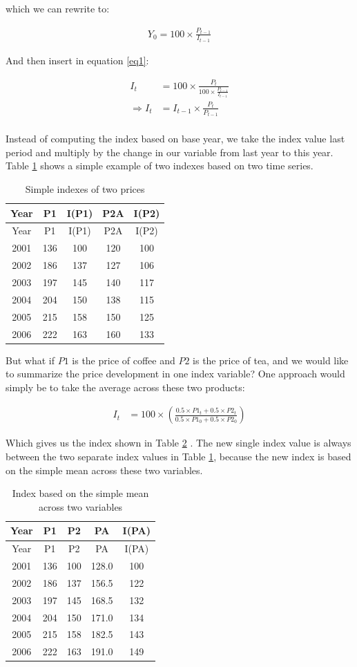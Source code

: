 \documentclass[]{book}
\begin{document}
which we can rewrite to:

\begin{align}
    Y_0=100\times \frac{P_{t-1}}{I_{t-1}}
    \label{eq3}
\end{align}

And then insert in equation \eqref{eq1}:

\begin{align}
    I_t&=100\times \frac{P_t}{100\times \frac{P_{t-1}}{I_{t-1}}}\nonumber\\
        \Rightarrow I_t&=I_{t-1}\times \frac{P_t}{ P_{t-1}}\nonumber\\
    \label{eq4}
\end{align}

Instead of computing the index based on base year, we take the index value last period and multiply by the change in our variable from last year to this year. Table \ref{tab:price1} shows a simple example of two indexes based on two time series.

\begin{longtable}[]{@{}ccccc@{}}
\caption{\label{tab:price1} Simple indexes of two prices}\tabularnewline
\toprule
Year & P1 & I(P1) & P2A & I(P2)\tabularnewline
\midrule
\endfirsthead
\toprule
Year & P1 & I(P1) & P2A & I(P2)\tabularnewline
\midrule
\endhead
2001 & 136 & 100 & 120 & 100\tabularnewline
2002 & 186 & 137 & 127 & 106\tabularnewline
2003 & 197 & 145 & 140 & 117\tabularnewline
2004 & 204 & 150 & 138 & 115\tabularnewline
2005 & 215 & 158 & 150 & 125\tabularnewline
2006 & 222 & 163 & 160 & 133\tabularnewline
\bottomrule
\end{longtable}

But what if \(P1\) is the price of coffee and \(P2\) is the price of tea, and we would like to summarize the price development in one index variable? One approach would simply be to take the average across these two products:

\begin{align}
   I_t&=100\times \left(\frac{0.5\times P1_t+0.5\times P2_t}{0.5\times P1_0+0.5\times P2_0}\right)
    \label{eq5}
\end{align}

Which gives us the index shown in Table \ref{tab:price2} . The new single index value is always between the two separate index values in Table \ref{tab:price1}, because the new index is based on the simple mean across these two variables.

\begin{longtable}[]{@{}ccccc@{}}
\caption{\label{tab:price2} Index based on the simple mean across two variables}\tabularnewline
\toprule
Year & P1 & P2 & PA & I(PA)\tabularnewline
\midrule
\endfirsthead
\toprule
Year & P1 & P2 & PA & I(PA)\tabularnewline
\midrule
\endhead
2001 & 136 & 100 & 128.0 & 100\tabularnewline
2002 & 186 & 137 & 156.5 & 122\tabularnewline
2003 & 197 & 145 & 168.5 & 132\tabularnewline
2004 & 204 & 150 & 171.0 & 134\tabularnewline
2005 & 215 & 158 & 182.5 & 143\tabularnewline
2006 & 222 & 163 & 191.0 & 149\tabularnewline
\bottomrule
\end{longtable}
\end{document}
